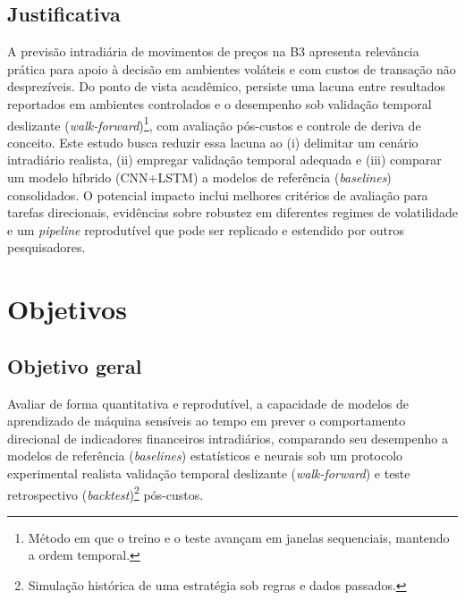 \subsection{Justificativa}
A previsão intradiária de movimentos de preços na B3 apresenta relevância prática para apoio à decisão em ambientes voláteis e com custos de transação não desprezíveis. Do ponto de vista acadêmico, persiste uma lacuna entre resultados reportados em ambientes controlados e o desempenho sob validação temporal deslizante (\textit{walk-forward})\footnote{Método em que o treino e o teste avançam em janelas sequenciais, mantendo a ordem temporal.}, com avaliação pós-custos e controle de deriva de conceito. Este estudo busca reduzir essa lacuna ao (i) delimitar um cenário intradiário realista, (ii) empregar validação temporal adequada e (iii) comparar um modelo híbrido (CNN+LSTM) a modelos de referência (\textit{baselines}) consolidados. O potencial impacto inclui melhores critérios de avaliação para tarefas direcionais, evidências sobre robustez em diferentes regimes de volatilidade e um \textit{pipeline} reprodutível que pode ser replicado e estendido por outros pesquisadores.



\section{Objetivos}

\subsection{Objetivo geral}
Avaliar de forma quantitativa e reprodutível, a capacidade de modelos de aprendizado de máquina sensíveis ao tempo em prever o comportamento direcional de indicadores financeiros intradiários, comparando seu desempenho a modelos de referência (\textit{baselines}) estatísticos e neurais sob um protocolo experimental realista validação temporal deslizante (\textit{walk-forward}) e teste retrospectivo (\textit{backtest})\footnote{Simulação histórica de uma estratégia sob regras e dados passados.} pós-custos.

